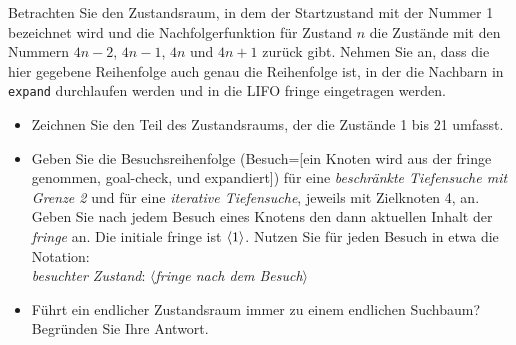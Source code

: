 


Betrachten Sie den Zustandsraum, in dem der Startzustand mit der
Nummer 1 bezeichnet wird und die Nachfolgerfunktion für Zustand $n$
die Zustände mit den Nummern $4n-2$, $4n-1$, $4n$ und $4n+1$ 
zurück gibt. Nehmen Sie an, dass die hier gegebene Reihenfolge auch
genau die Reihenfolge ist, in der die Nachbarn in \texttt{expand}
durchlaufen werden und in die LIFO fringe eingetragen werden.

\begin{itemize}
\item
Zeichnen Sie den Teil des Zustandsraums, der die Zustände 1 bis 21 umfasst.

\item
Geben Sie die Besuchsreihenfolge (Besuch=[ein Knoten wird aus der
fringe genommen, goal-check, und expandiert]) für eine {\em beschränkte
Tiefensuche mit Grenze 2} und für eine {\em iterative Tiefensuche},
jeweils mit Zielknoten 4, an. Geben Sie nach jedem Besuch eines
Knotens den dann aktuellen Inhalt der \emph{fringe} an. Die initiale
fringe ist $\left\langle 1 \right\rangle$. Nutzen Sie für jeden Besuch in etwa die Notation:\\
\emph{besuchter Zustand}: $\langle$\emph{fringe nach dem Besuch}$\rangle$

\item
Führt ein endlicher Zustandsraum immer zu einem endlichen Suchbaum? Begründen Sie Ihre Antwort.
\end{itemize}


\exerfoot
